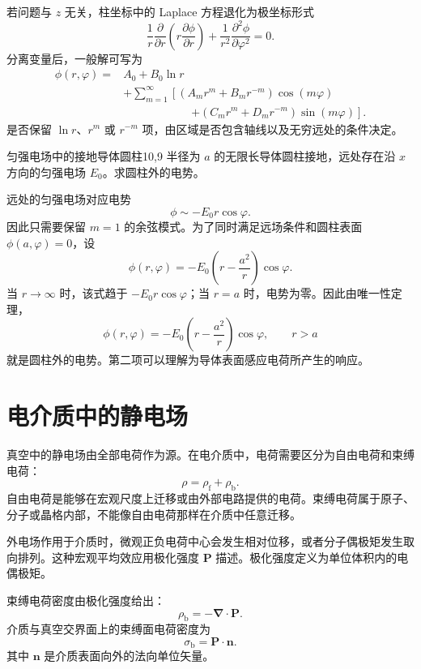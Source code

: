 若问题与 $z$ 无关，柱坐标中的 Laplace 方程退化为极坐标形式
\[
\frac{1}{r}
\frac{\partial}{\partial r}
\left(
r\frac{\partial\phi}{\partial r}
\right)
+
\frac{1}{r^{2}}
\frac{\partial^{2}\phi}{\partial\varphi^{2}}
=0.
\]
分离变量后，一般解可写为
\begin{equation}
	\begin{aligned}
	\phi(r,\varphi)
	={}&
	A_{0}+B_{0}\ln r\\
	&+
	\sum_{m=1}^{\infty}
	\left[
	(A_{m}r^{m}+B_{m}r^{-m})\cos(m\varphi)
	\right.\\
	&\hspace{6em}\left.
	+
	(C_{m}r^{m}+D_{m}r^{-m})\sin(m\varphi)
	\right].
	\end{aligned}
	\label{eq:10:cylindrical-separated-solution}
\end{equation}
是否保留 $\ln r$、$r^{m}$ 或 $r^{-m}$ 项，由区域是否包含轴线以及无穷远处的条件决定。

\begin{example}{匀强电场中的接地导体圆柱}{10,9}
半径为 $a$ 的无限长导体圆柱接地，远处存在沿 $x$ 方向的匀强电场
$E_{0}$。求圆柱外的电势。

\begin{solution}
远处的匀强电场对应电势
\[
\phi\sim -E_{0}r\cos\varphi.
\]
因此只需要保留 $m=1$ 的余弦模式。为了同时满足远场条件和圆柱表面
$\phi(a,\varphi)=0$，设
\[
\phi(r,\varphi)
=
-E_{0}
\left(
r-\frac{a^{2}}{r}
\right)
\cos\varphi.
\]
当 $r\to\infty$ 时，该式趋于 $-E_{0}r\cos\varphi$；当 $r=a$ 时，电势为零。因此由唯一性定理，
\[
\phi(r,\varphi)
=
-E_{0}
\left(
r-\frac{a^{2}}{r}
\right)
\cos\varphi,
\qquad
r>a
\]
就是圆柱外的电势。第二项可以理解为导体表面感应电荷所产生的响应。
\end{solution}
\end{example}

\section{电介质中的静电场}

真空中的静电场由全部电荷作为源。在电介质中，电荷需要区分为自由电荷和束缚电荷：
\[
\rho
=
\rho_{\mathrm{f}}
+
\rho_{\mathrm{b}}.
\]
自由电荷是能够在宏观尺度上迁移或由外部电路提供的电荷。束缚电荷属于原子、分子或晶格内部，不能像自由电荷那样在介质中任意迁移。

外电场作用于介质时，微观正负电荷中心会发生相对位移，或者分子偶极矩发生取向排列。这种宏观平均效应用极化强度 $\bm{P}$ 描述。极化强度定义为单位体积内的电偶极矩。

束缚电荷密度由极化强度给出：
\begin{equation}
	\rho_{\mathrm{b}}
	=
	-\bm{\nabla}\cdot\bm{P}.
	\label{eq:10:bound-volume-charge}
\end{equation}
介质与真空交界面上的束缚面电荷密度为
\begin{equation}
	\sigma_{\mathrm{b}}
	=
	\bm{P}\cdot\bm{n}.
	\label{eq:10:bound-surface-charge}
\end{equation}
其中 $\bm{n}$ 是介质表面向外的法向单位矢量。


